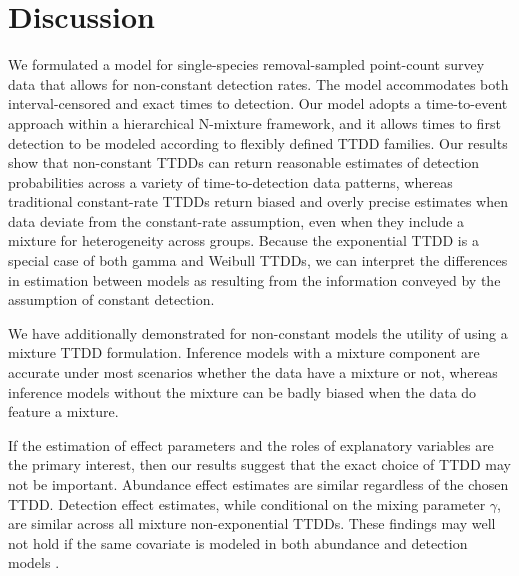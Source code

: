 \documentclass[12pt]{article}
\newif\ifdic   %
\begin{document}
\section{Discussion} \label{sec:discuss}

We formulated a model for single-species removal-sampled point-count survey data that allows for non-constant detection rates.
The model accommodates both interval-censored and exact times to detection.
Our model adopts a time-to-event approach within a hierarchical N-mixture framework, and it allows times to first detection to be modeled according to flexibly defined TTDD families.
Our results show that non-constant TTDDs can return reasonable estimates of detection probabilities across a variety of time-to-detection data patterns, whereas traditional constant-rate TTDDs return biased and overly precise estimates when data deviate from the constant-rate assumption, even when they include a mixture for heterogeneity across groups.  
Because the exponential TTDD is a special case of both gamma and Weibull TTDDs, we can interpret the differences in estimation between models as resulting from the information conveyed by the assumption of constant detection.

We have additionally demonstrated for non-constant models the utility of using a mixture TTDD formulation.
Inference models with a mixture component are accurate under most scenarios whether the data have a mixture or not, whereas inference models without the mixture can be badly biased when the data do feature a mixture.  

If the estimation of effect parameters and the roles of explanatory variables are the primary interest, then our results suggest that the exact choice of TTDD may not be important.  
Abundance effect estimates are similar regardless of the chosen TTDD.
Detection effect estimates, while conditional on the mixing parameter $\gamma$, are similar across all mixture non-exponential TTDDs.  
These findings may well not hold if the same covariate is modeled in both abundance and detection models \citep{Kery2008}.

\ifdic
In a limited set of situations, posterior predictive checks and DIC can identify when non-mixture or exponential TTDDs inadequately describe the marginal pattern of detections over time.  
But in many situations, neither tool points a clear way to select the correct family of TTDD.  
\fi
\end{document}
